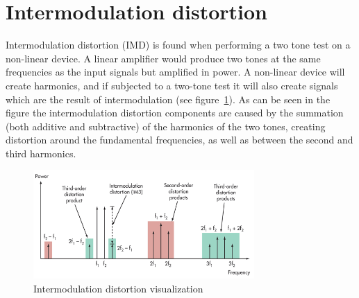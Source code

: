 \section{Intermodulation distortion}
Intermodulation distortion (IMD) is found when performing a two tone test on a non-linear device. A linear amplifier would produce two tones at the same frequencies as the input signals but amplified in power. A non-linear device will create harmonics, and if subjected to a two-tone test it will also create signals which are the result of intermodulation (see figure~\ref{fig:fig_distortion_vis}). As can be seen in the figure the intermodulation distortion components are caused by the summation (both additive and subtractive) of the harmonics of the two tones, creating distortion around the fundamental frequencies, as well as between the second and third harmonics.
\begin{figure}[H]
	  \centering
	  \includegraphics[width=0.75\textwidth]{img/Intermodulation_distortion}
	  \caption{Intermodulation distortion visualization}
	  \label{fig:fig_distortion_vis}
\end{figure}
